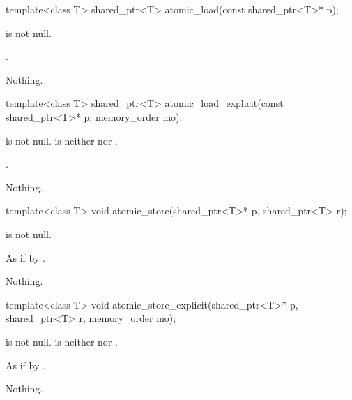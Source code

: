 %
\begin{itemdecl}
template<class T> shared_ptr<T> atomic_load(const shared_ptr<T>* p);
\end{itemdecl}

\begin{itemdescr}
\pnum
\expects
{} is not null.

\pnum
\returns
{}.

\pnum
\throws
Nothing.
\end{itemdescr}

%
\begin{itemdecl}
template<class T> shared_ptr<T> atomic_load_explicit(const shared_ptr<T>* p, memory_order mo);
\end{itemdecl}

\begin{itemdescr}
\pnum
\expects
{} is not null.
 is neither  nor .

\pnum
\returns
{}.

\pnum
\throws
Nothing.
\end{itemdescr}

%
\begin{itemdecl}
template<class T> void atomic_store(shared_ptr<T>* p, shared_ptr<T> r);
\end{itemdecl}

\begin{itemdescr}
\pnum
\expects
{} is not null.

\pnum
\effects
As if by .

\pnum
\throws
Nothing.
\end{itemdescr}

%
\begin{itemdecl}
template<class T> void atomic_store_explicit(shared_ptr<T>* p, shared_ptr<T> r, memory_order mo);
\end{itemdecl}

\begin{itemdescr}
\pnum
\expects
{} is not null.
 is neither  nor .

\pnum
\effects
As if by .

\pnum
\throws
Nothing.
\end{itemdescr}

